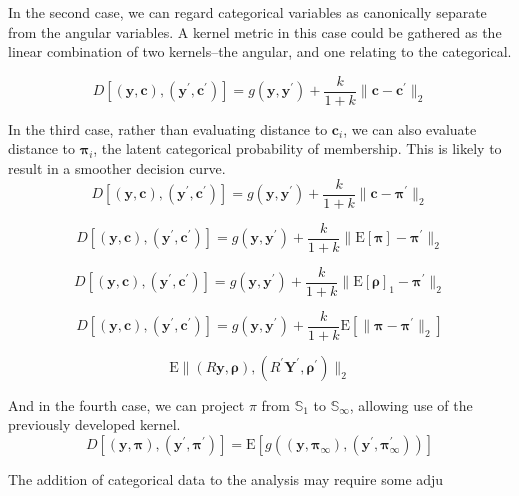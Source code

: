 In the second case, we can regard categorical variables as canonically separate from the angular variables. 
    A kernel metric in this case could be gathered as the linear combination of two kernels--the angular, and one relating to the categorical.
    
\begin{equation*}
    D\left[(\bm{y},\bm{c}), (\bm{y}^{\prime}, \bm{c}^{\prime})\right] = g(\bm{y},\bm{y}^{\prime}) + \frac{k}{1 + k}\lVert \bm{c} - \bm{c}^{\prime}\rVert_2
\end{equation*}
    
In the third case, rather than evaluating distance to $\bm{c}_i$, we can also evaluate distance to $\bm{\pi}_i$,
    the latent categorical probability of membership.  This is likely to result in a smoother decision curve.
\begin{equation*}
    D\left[(\bm{y},\bm{c}), (\bm{y}^{\prime}, \bm{c}^{\prime})\right] = g(\bm{y},\bm{y}^{\prime}) + \frac{k}{1 + k}\lVert \bm{c} - \bm{\pi}^{\prime}\rVert_2
\end{equation*}

\[
    D\left[(\bm{y},\bm{c}), (\bm{y}^{\prime}, \bm{c}^{\prime})\right] = g(\bm{y},\bm{y}^{\prime}) + \frac{k}{1 + k}\lVert \text{E}[\bm{\pi}] - \bm{\pi}^{\prime}\rVert_2
\]

\[
    D\left[(\bm{y},\bm{c}), (\bm{y}^{\prime}, \bm{c}^{\prime})\right] = g(\bm{y},\bm{y}^{\prime}) + \frac{k}{1 + k}\lVert \text{E}[\bm{\rho}]_1 - \bm{\pi}^{\prime}\rVert_2
\]




\begin{equation*}
    D\left[(\bm{y},\bm{c}), (\bm{y}^{\prime}, \bm{c}^{\prime})\right] = g(\bm{y},\bm{y}^{\prime}) + \frac{k}{1 + k}\text{E}\left[\lVert \bm{\pi} - \bm{\pi}^{\prime}\rVert_2\right]
\end{equation*}

\[
    \text{E}\lVert (R\bm{y},\bm{\rho}), (R^\prime\bm{Y}^\prime,\bm{\rho}^\prime)\rVert_2
\]


And in the fourth case, we can project $\pi$ from $\mathbb{S}_1$ to $\mathbb{S}_{\infty}$, allowing use of
    the previously developed kernel.
\begin{equation*}
    D\left[(\bm{y},\bm{\pi}), (\bm{y}^{\prime}, \bm{\pi}^{\prime})\right] = \text{E}\left[ g\left((\bm{y},\bm{\pi}_{\infty}), (\bm{y}^{\prime},\bm{\pi}_{\infty}^{\prime})\right)\right]
\end{equation*}



The addition of categorical data to the analysis may require some adju







